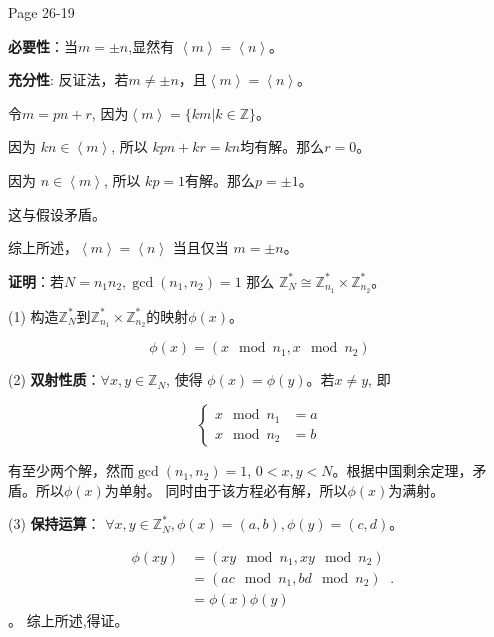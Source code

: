 \documentclass{ximera}
\begin{document}
\begin{problem} Page 26-19 
    \begin{solution}
        \textbf{必要性}：当$m=\pm n$,显然有 $\left \langle m \right \rangle  = \left \langle n \right \rangle$。
        
        \textbf{充分性}: 反证法，若$m \not= \pm n$，且$\left \langle m \right \rangle  = \left \langle n \right \rangle$。

        令$m=pn+r$, 因为$\left \langle m \right \rangle = \{km|k \in \mathbb{Z}\}$。
        
        因为 $kn \in \left \langle m \right \rangle$, 所以 $kpn+kr=kn$均有解。那么$r=0$。

        因为 $n \in \left \langle m \right \rangle$, 所以 $kp=1$有解。那么$p=\pm 1$。

        这与假设矛盾。

        综上所述，$\left \langle m \right \rangle  = \left \langle n \right \rangle$ 当且仅当 $m=\pm n$。
    \end{solution}
\end{problem}

\begin{problem} \textbf{证明}：若$N = n_1n_2,\gcd(n_1,n_2)=1$
    那么 $\mathbb{Z}_N^*\cong\mathbb{Z}_{n_1}^*\times\mathbb{Z}_{n_2}^*$。
    \begin{solution}
        (1) 构造$\mathbb{Z}_N^*$到$\mathbb{Z}_{n_1}^*\times\mathbb{Z}_{n_2}^*$的映射$\phi(x)$。

        $$\phi(x) = (x \mod n_1, x \mod n_2)$$

        (2) \textbf{双射性质}：$\forall x, y \in \mathbb{Z}_{N}$, 使得
        $\phi(x)=\phi(y)$。若$x\not=y$, 即
        
        $$ 
        \left\{
            \begin{aligned}
                x \mod n_1 &= a \\
                x \mod n_2 &= b
            \end{aligned}
        \right.
        $$

        有至少两个解，然而$\gcd(n_1,n_2)=1$, $0 < x, y < N$。根据中国剩余定理，矛盾。所以$\phi(x)$为单射。
        同时由于该方程必有解，所以$\phi(x)$为满射。

        (3) \textbf{保持运算}：
            $\forall x, y \in \mathbb{Z}_N^*, \phi(x) = (a, b), \phi(y) = (c, d)$。

            $$
                \begin{aligned}                    
                    \phi(xy)&=(xy \mod n_1, xy \mod n_2)\\
                    &=(ac \mod n_1, bd \mod n_2)\\
                    &=\phi(x)\phi(y)
                \end{aligned}.
            $$。
        综上所述,得证。
    \end{solution}
\end{problem}
\end{document}

